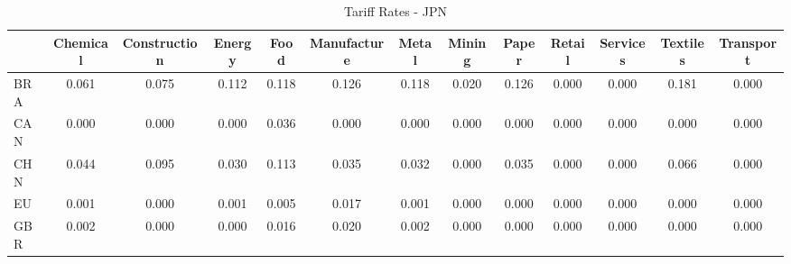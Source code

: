 \begin{table}[htbp]
\centering
\caption{Tariff Rates - JPN} 
\label{tab:tariff_JPN}
\begin{tabular}{lcccccccccccc}
  \hline
 & Chemical & Construction & Energy & Food & Manufacture & Metal & Mining & Paper & Retail & Services & Textiles & Transport \\ 
  \hline
BRA & \textcolor[RGB]{32,21,223}{0.061} & \textcolor[RGB]{25,16,230}{0.075} & \textcolor[RGB]{19,12,236}{0.112} & \textcolor[RGB]{13,8,242}{0.118} & \textcolor[RGB]{8,5,246}{0.126} & \textcolor[RGB]{15,10,240}{0.118} & \textcolor[RGB]{79,51,176}{0.020} & \textcolor[RGB]{11,7,244}{0.126} & \textcolor[RGB]{255,165,0}{0.000} & \textcolor[RGB]{255,165,0}{0.000} & \textcolor[RGB]{2,1,253}{0.181} & \textcolor[RGB]{255,165,0}{0.000} \\ 
  CAN & \textcolor[RGB]{255,165,0}{0.000} & \textcolor[RGB]{255,165,0}{0.000} & \textcolor[RGB]{255,165,0}{0.000} & \textcolor[RGB]{47,30,208}{0.036} & \textcolor[RGB]{117,76,138}{0.000} & \textcolor[RGB]{255,165,0}{0.000} & \textcolor[RGB]{255,165,0}{0.000} & \textcolor[RGB]{255,165,0}{0.000} & \textcolor[RGB]{255,165,0}{0.000} & \textcolor[RGB]{255,165,0}{0.000} & \textcolor[RGB]{255,165,0}{0.000} & \textcolor[RGB]{255,165,0}{0.000} \\ 
  CHN & \textcolor[RGB]{40,26,215}{0.044} & \textcolor[RGB]{21,14,234}{0.095} & \textcolor[RGB]{59,38,196}{0.030} & \textcolor[RGB]{17,11,238}{0.113} & \textcolor[RGB]{53,34,202}{0.035} & \textcolor[RGB]{57,37,198}{0.032} & \textcolor[RGB]{255,165,0}{0.000} & \textcolor[RGB]{51,33,204}{0.035} & \textcolor[RGB]{255,165,0}{0.000} & \textcolor[RGB]{255,165,0}{0.000} & \textcolor[RGB]{30,19,225}{0.066} & \textcolor[RGB]{255,165,0}{0.000} \\ 
  EU & \textcolor[RGB]{110,72,144}{0.001} & \textcolor[RGB]{255,165,0}{0.000} & \textcolor[RGB]{108,70,147}{0.001} & \textcolor[RGB]{98,63,157}{0.005} & \textcolor[RGB]{85,55,170}{0.017} & \textcolor[RGB]{113,73,142}{0.001} & \textcolor[RGB]{255,165,0}{0.000} & \textcolor[RGB]{255,165,0}{0.000} & \textcolor[RGB]{255,165,0}{0.000} & \textcolor[RGB]{255,165,0}{0.000} & \textcolor[RGB]{255,165,0}{0.000} & \textcolor[RGB]{255,165,0}{0.000} \\ 
  GBR & \textcolor[RGB]{102,66,153}{0.002} & \textcolor[RGB]{255,165,0}{0.000} & \textcolor[RGB]{115,74,140}{0.000} & \textcolor[RGB]{87,56,168}{0.016} & \textcolor[RGB]{81,52,174}{0.020} & \textcolor[RGB]{102,66,153}{0.002} & \textcolor[RGB]{255,165,0}{0.000} & \textcolor[RGB]{255,165,0}{0.000} & \textcolor[RGB]{255,165,0}{0.000} & \textcolor[RGB]{255,165,0}{0.000} & \textcolor[RGB]{255,165,0}{0.000} & \textcolor[RGB]{255,165,0}{0.000} \\ 

\end{tabular}
\end{table}
